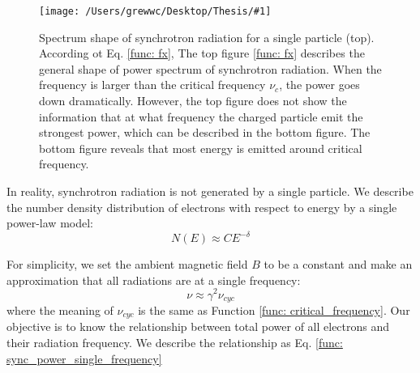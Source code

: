 \documentclass[12pt]{report}
\newcommand{\singleFig}[3]{
  \begin{figure}[!ht]
    \centering
    \texttt{[image: /Users/grewwc/Desktop/Thesis/\#1]}
    \caption{#3}
    \label{fig: #1}
  \end{figure}
}
\begin{document}
            \singleFig{sync_spectrum_loglog_combined}{0.5}{Spectrum shape of synchrotron 
            radiation for a single particle (top). According ot Eq. \ref{func: fx},
            The top figure \ref{func: fx} describes the general shape of power spectrum of 
            synchrotron radiation. When the frequency is larger than
            the critical frequency $\nu_c$, the power goes down dramatically. However, the 
            top figure does not show the information that at what frequency the charged 
            particle emit the strongest power, which can be described in the bottom figure. 
            The bottom figure reveals that most energy is emitted around critical frequency.}
  
            In reality, synchrotron radiation is not generated by a single particle. We 
            describe the number density distribution of electrons with respect to energy by a 
            single power-law model:
            \begin{equation}
              \label{func: sync_number_density}
              N\left(E\right) \approx C E^{-\delta}
            \end{equation}
          
            For simplicity, we set the ambient magnetic field $B$ to be a constant and make an 
            approximation that all radiations are at a single frequency:
            \begin{equation}
              \label{func: sync_approximation}
              \nu \approx \gamma^2 \nu_{cyc}
            \end{equation}
            where the meaning of $\nu_{cyc}$ is the same as Function 
            \ref{func: critical_frequency}. Our objective is to know the relationship between 
            total power of all electrons and their radiation frequency. We describe the 
            relationship as Eq. \ref{func: sync_power_single_frequency}
            
\end{document}
